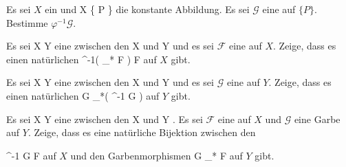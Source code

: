 {}
{





Es sei $X$ ein
und
\maabb {\varphi} { X } { \{ P \}
} {}
die konstante Abbildung. Es sei ${ \mathcal  G   }$ eine
auf $\{P \}$. Bestimme $\varphi^{-1} { \mathcal  G   }$.





}
{} {}

{}
{





Es sei
\maabb {\varphi} { X } { Y
} {}
eine
zwischen den
\mathkor {} {X} {und} {Y} {}
und es sei ${ \mathcal  F   }$ eine
auf $X$. Zeige, dass es einen natürlichen
\maabbdisp {} { \varphi^{-1}(  \varphi_* { \mathcal  F   }) } { { \mathcal  F   }
} {}
auf $X$ gibt.





}
{} {}

{}
{





Es sei
\maabb {\varphi} { X } { Y
} {}
eine
zwischen den
\mathkor {} {X} {und} {Y} {}
und es sei ${ \mathcal  G   }$ eine
auf $Y$. Zeige, dass es einen natürlichen
\maabbdisp {} { { \mathcal  G   } } { \varphi_*(  \varphi^{-1} { \mathcal  G   })
} {}
auf $Y$ gibt.





}
{} {}

{}
{





Es sei
\maabb {\varphi} { X } { Y
} {}
eine
zwischen den
\mathkor {} {X} {und} {Y} {.}
Es sei ${ \mathcal  F   }$ eine
auf $X$ und ${ \mathcal  G   }$ eine Garbe auf $Y$. Zeige, dass es eine natürliche Bijektion zwischen den

\maabbdisp {\psi} { \varphi^{-1} { \mathcal  G   } } { { \mathcal  F   }
} {}
auf $X$ und den Garbenmorphismen
\maabbdisp {\theta} { { \mathcal  G   } } { \varphi_* { \mathcal  F   }
} {}
auf $Y$ gibt.





}
{} {}

